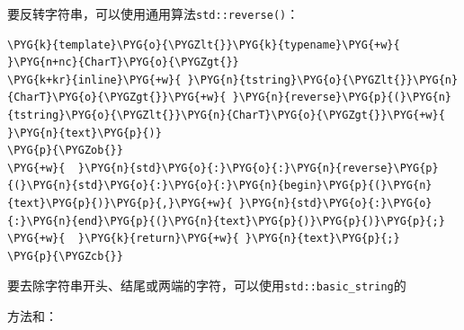 
要反转字符串，可以使用通用算法\texttt{std::\allowbreak{}reverse()}：



\begin{codeblockbg}
\begin{Verbatim}[commandchars=\\\{\},breaklines=true,breakanywhere=true,fontsize=\codefont,xleftmargin=17bp]
\PYG{k}{template}\PYG{o}{\PYGZlt{}}\PYG{k}{typename}\PYG{+w}{ }\PYG{n+nc}{CharT}\PYG{o}{\PYGZgt{}}
\PYG{k+kr}{inline}\PYG{+w}{ }\PYG{n}{tstring}\PYG{o}{\PYGZlt{}}\PYG{n}{CharT}\PYG{o}{\PYGZgt{}}\PYG{+w}{ }\PYG{n}{reverse}\PYG{p}{(}\PYG{n}{tstring}\PYG{o}{\PYGZlt{}}\PYG{n}{CharT}\PYG{o}{\PYGZgt{}}\PYG{+w}{ }\PYG{n}{text}\PYG{p}{)}
\PYG{p}{\PYGZob{}}
\PYG{+w}{  }\PYG{n}{std}\PYG{o}{:}\PYG{o}{:}\PYG{n}{reverse}\PYG{p}{(}\PYG{n}{std}\PYG{o}{:}\PYG{o}{:}\PYG{n}{begin}\PYG{p}{(}\PYG{n}{text}\PYG{p}{)}\PYG{p}{,}\PYG{+w}{ }\PYG{n}{std}\PYG{o}{:}\PYG{o}{:}\PYG{n}{end}\PYG{p}{(}\PYG{n}{text}\PYG{p}{)}\PYG{p}{)}\PYG{p}{;}
\PYG{+w}{  }\PYG{k}{return}\PYG{+w}{ }\PYG{n}{text}\PYG{p}{;}
\PYG{p}{\PYGZcb{}}
\end{Verbatim}
\end{codeblockbg}



要去除字符串开头、结尾或两端的字符，可以使用\texttt{std::\allowbreak{}basic\_\allowbreak{}string}的



方法和：



